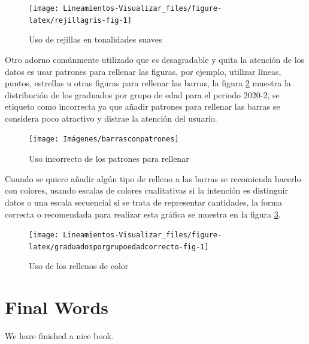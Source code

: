 \documentclass[
]{book}
\begin{document}
\begin{figure}

{\centering \texttt{[image: Lineamientos-Visualizar\_files/figure-latex/rejillagris-fig-1]} 

}

\caption{Uso de rejillas en tonalidades suaves}\label{fig:rejillagris-fig}
\end{figure}

Otro adorno comúnmente utilizado que es desagradable y quita la atención de los datos es usar patrones para rellenar las figuras, por ejemplo, utilizar líneas, puntos, estrellas u otras figuras para rellenar las barras, la figura \ref{fig:barrasconpatrones-fig} muestra la distribución de los graduados por grupo de edad para el periodo 2020-2, se etiqueto como incorrecta ya que añadir patrones para rellenar las barras se considera poco atractivo y distrae la atención del usuario.

\begin{figure}

{\centering \texttt{[image: Imágenes/barrasconpatrones]} 

}

\caption{Uso incorrecto de los patrones para rellenar}\label{fig:barrasconpatrones-fig}
\end{figure}

Cuando se quiere añadir algún tipo de relleno a las barras se recomienda hacerlo con colores, usando escalas de colores cualitativas si la intención es distinguir datos o una escala secuencial si se trata de representar cantidades, la forma correcta o recomendada para realizar esta gráfica se muestra en la figura \ref{fig:graduadosporgrupoedadcorrecto-fig}.

\begin{figure}

{\centering \texttt{[image: Lineamientos-Visualizar\_files/figure-latex/graduadosporgrupoedadcorrecto-fig-1]} 

}

\caption{Uso de los rellenos de color}\label{fig:graduadosporgrupoedadcorrecto-fig}
\end{figure}

\hypertarget{final-words}{%
\chapter{Final Words}\label{final-words}}

We have finished a nice book.

  
\end{document}
